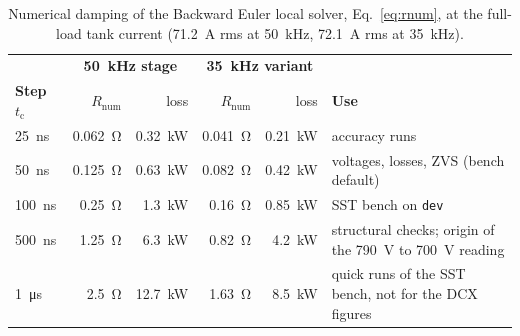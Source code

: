 \documentclass[12pt,a4paper]{scrartcl}
\newcommand{\ped}[1]{_{\mathrm{#1}}}
\newcommand{\code}[1]{\texttt{#1}}
\begin{document}
\begin{onehalfspace}
\begin{table}[H]
	\centering
	\captionsetup{width=0.9\textwidth, font=small}
	\caption{Numerical damping of the Backward Euler local solver, Eq.~\eqref{eq:rnum}, at the full-load tank current (\SI{71.2}{\ampere} rms at \SI{50}{\kilo\hertz}, \SI{72.1}{\ampere} rms at \SI{35}{\kilo\hertz}).}
	\label{tab:numerics}
	\small
	\begin{tabularx}{0.97\textwidth}{@{} l r r r r X @{}}
		\toprule
		& \multicolumn{2}{c}{\textbf{\SI{50}{\kilo\hertz} stage}} & \multicolumn{2}{c}{\textbf{\SI{35}{\kilo\hertz} variant}} & \\
		\textbf{Step $t\ped{c}$} & $R\ped{num}$ & loss & $R\ped{num}$ & loss & \textbf{Use} \\
		\midrule
		\SI{25}{\nano\second} & \SI{0.062}{\ohm} & \SI{0.32}{\kilo\watt} & \SI{0.041}{\ohm} & \SI{0.21}{\kilo\watt} & accuracy runs \\
		\SI{50}{\nano\second} & \SI{0.125}{\ohm} & \SI{0.63}{\kilo\watt} & \SI{0.082}{\ohm} & \SI{0.42}{\kilo\watt} & voltages, losses, ZVS (bench default) \\
		\SI{100}{\nano\second} & \SI{0.25}{\ohm} & \SI{1.3}{\kilo\watt} & \SI{0.16}{\ohm} & \SI{0.85}{\kilo\watt} & SST bench on \code{dev} \\
		\SI{500}{\nano\second} & \SI{1.25}{\ohm} & \SI{6.3}{\kilo\watt} & \SI{0.82}{\ohm} & \SI{4.2}{\kilo\watt} & structural checks; origin of the \SI{790}{\volt} to \SI{700}{\volt} reading \\
		\SI{1}{\micro\second} & \SI{2.5}{\ohm} & \SI{12.7}{\kilo\watt} & \SI{1.63}{\ohm} & \SI{8.5}{\kilo\watt} & quick runs of the SST bench, not for the DCX figures \\
		\bottomrule
	\end{tabularx}
\end{table}


\end{onehalfspace}
\end{document}
